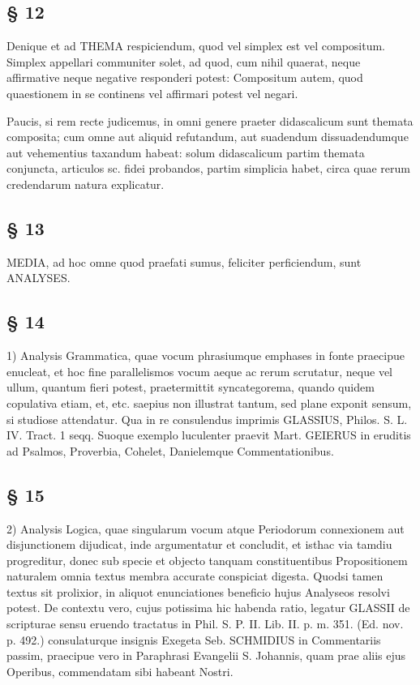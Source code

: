 \subsection{§ 12}

Denique et ad THEMA respiciendum, quod vel simplex est vel compositum. Simplex appellari communiter solet, ad quod, cum nihil quaerat, neque affirmative neque negative responderi potest: Compositum autem, quod quaestionem in se continens vel affirmari potest vel negari.

Paucis, si rem recte judicemus, in omni genere praeter didascalicum sunt themata composita; cum omne aut aliquid refutandum, aut suadendum dissuadendumque aut vehementius taxandum habeat: solum didascalicum partim themata conjuncta, articulos sc. fidei probandos, partim simplicia habet, circa quae rerum credendarum natura explicatur.

\subsection{§ 13}

MEDIA, ad hoc omne quod praefati sumus, feliciter perficiendum, sunt ANALYSES.

\subsection{§ 14}

1) Analysis Grammatica, quae vocum phrasiumque emphases in fonte praecipue enucleat, et hoc fine parallelismos vocum aeque ac rerum scrutatur, neque vel ullum, quantum fieri potest, praetermittit syncategorema, quando quidem copulativa etiam, et, etc. saepius non illustrat tantum, sed plane exponit sensum, si studiose attendatur. Qua in re consulendus imprimis GLASSIUS, Philos. S. L. IV. Tract. 1 seqq. Suoque exemplo luculenter praevit Mart. GEIERUS in eruditis ad Psalmos, Proverbia, Cohelet, Danielemque Commentationibus.

\subsection{§ 15}

2) Analysis Logica, quae singularum vocum atque Periodorum connexionem aut disjunctionem dijudicat, inde argumentatur et concludit, et isthac via tamdiu progreditur, donec sub specie et objecto tanquam constituentibus Propositionem naturalem omnia textus membra accurate conspiciat digesta. Quodsi tamen textus sit prolixior, in aliquot enunciationes beneficio hujus Analyseos resolvi potest. De contextu vero, cujus potissima hic habenda ratio, legatur GLASSII de scripturae sensu eruendo tractatus in Phil. S. P. II. Lib. II. p. m. 351. (Ed. nov. p. 492.) consulaturque insignis Exegeta Seb. SCHMIDIUS in Commentariis passim, praecipue vero in Paraphrasi Evangelii S. Johannis, quam prae aliis ejus Operibus, commendatam sibi habeant Nostri.

